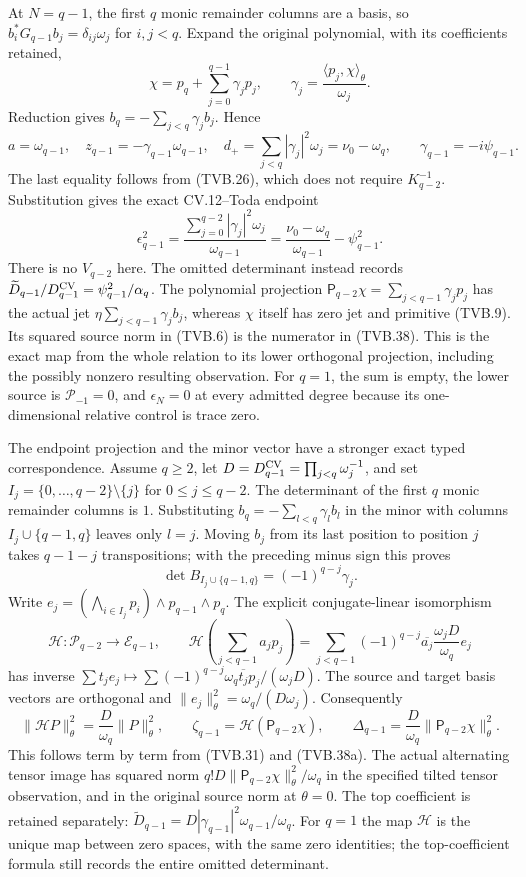 \documentclass[11pt]{article}
\begin{document}
At $N=q-1$, the first $q$ monic remainder columns are a basis,
so $b_i^*G_{q-1}b_j=\delta_{ij}\omega_j$ for $i,j<q$.
Expand the original polynomial, with its coefficients retained,
\[
 \chi=p_q+\sum_{j=0}^{q-1}\gamma_jp_j,\qquad
 \gamma_j=\frac{\langle p_j,\chi\rangle_\theta}{\omega_j}.
 \tag{TVB.37}
\]
Reduction gives $b_q=-\sum_{j<q}\gamma_jb_j$. Hence
\[
 a=\omega_{q-1},\quad z_{q-1}=-\gamma_{q-1}\omega_{q-1},\quad
 d_+=\sum_{j<q}|\gamma_j|^2\omega_j=\nu_0-\omega_q,
 \qquad\gamma_{q-1}=-i\psi_{q-1}.
\]
The last equality follows from (TVB.26), which does not require
$K_{q-2}^{-1}$. Substitution gives the exact CV.12--Toda endpoint
\[
 \boxed{\epsilon_{q-1}^2
 =\frac{\sum_{j=0}^{q-2}|\gamma_j|^2\omega_j}{\omega_{q-1}}
 =\frac{\nu_0-\omega_q}{\omega_{q-1}}-\psi_{q-1}^2.}
 \tag{TVB.38}
\]
There is no $V_{q-2}$ here. The omitted determinant instead records
$\widetilde D_{q-1}/D_{q-1}^{\rm CV}=\psi_{q-1}^2/\alpha_q$.
The polynomial projection
$\mathsf P_{q-2}\chi=\sum_{j<q-1}\gamma_jp_j$ has the actual
jet $\eta\sum_{j<q-1}\gamma_jb_j$, whereas $\chi$ itself has
zero jet and primitive (TVB.9). Its squared source norm in (TVB.6)
is the numerator in (TVB.38). This is the exact map from the
whole relation to its lower orthogonal projection, including the
possibly nonzero resulting observation.
For $q=1$, the sum is empty, the lower source is $\mathcal P_{-1}=0$,
and $\epsilon_N=0$ at every admitted degree because its one-dimensional
relative control is trace zero.

The endpoint projection and the minor vector have a stronger exact
typed correspondence. Assume $q\ge2$, let
$D=D_{q-1}^{\rm CV}=\prod_{j<q}\omega_j^{-1}$, and set
$I_j=\{0,\ldots,q-2\}\setminus\{j\}$ for $0\le j\le q-2$.
The determinant of the first $q$ monic remainder columns is $1$.
Substituting $b_q=-\sum_{l<q}\gamma_lb_l$ in the minor with columns
$I_j\cup\{q-1,q\}$ leaves only $l=j$. Moving $b_j$ from its
last position to position $j$ takes $q-1-j$ transpositions; with
the preceding minus sign this proves
\[
 \det B_{I_j\cup\{q-1,q\}}=(-1)^{q-j}\gamma_j.
 \tag{TVB.38a}
\]
Write
$e_j=(\bigwedge_{i\in I_j}p_i)\wedge p_{q-1}\wedge p_q$.
The explicit conjugate-linear isomorphism
\[
 \mathcal H:\mathcal P_{q-2}\longrightarrow\mathcal E_{q-1},\qquad
 \mathcal H\left(\sum_{j<q-1}a_jp_j\right)
   =\sum_{j<q-1}(-1)^{q-j}\overline{a_j}
                 \frac{\omega_jD}{\omega_q}e_j
 \tag{TVB.38b}
\]
has inverse $\sum t_je_j\mapsto
\sum(-1)^{q-j}\omega_q\overline{t_j}p_j/(\omega_jD)$.
The source and target basis vectors are orthogonal and
$\|e_j\|_\theta^2=\omega_q/(D\omega_j)$. Consequently
\[
 \|\mathcal HP\|_\theta^2=\frac D{\omega_q}\|P\|_\theta^2,
 \qquad\zeta_{q-1}=\mathcal H(\mathsf P_{q-2}\chi),\qquad
 \Delta_{q-1}=\frac D{\omega_q}\|\mathsf P_{q-2}\chi\|_\theta^2.
 \tag{TVB.38c}
\]
This follows term by term from (TVB.31) and (TVB.38a).
The actual alternating tensor image has squared norm
$q!D\|\mathsf P_{q-2}\chi\|_\theta^2/\omega_q$ in the
specified tilted tensor observation, and in the original source
norm at $\theta=0$. The top coefficient is retained separately:
$\widetilde D_{q-1}
 =D|\gamma_{q-1}|^2\omega_{q-1}/\omega_q$.
For $q=1$ the map $\mathcal H$ is the unique map between zero
spaces, with the same zero identities; the top-coefficient formula
still records the entire omitted determinant.
\end{document}
